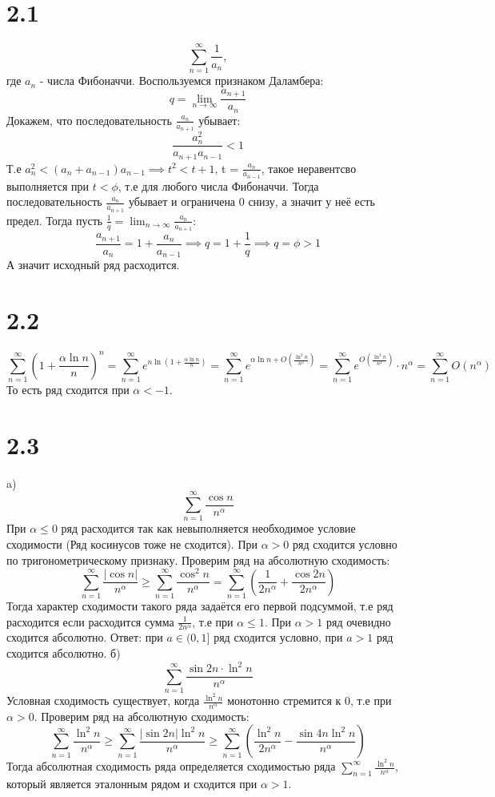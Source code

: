 \documentclass[12pt]{article}
\begin{document}
\section{2.1}
\[
    \sum_{n=1}^{\infty} \frac{1}{a_n},
\]
где $a_n$ - числа Фибоначчи. Воспользуемся признаком Даламбера:
\[
    q = \lim_{n \to \infty} \frac{a_{n+1} }{a_{n}}
\] 
Докажем, что последовательность $\frac{a_n}{a_{n+1} }$ убывает: 
\[
    \frac{a_n^2 }{a_{n+1} a_{n-1}} < 1 
\]
Т.е $a_n^2 < (a_n + a_{n-1} ) a_{n-1} \implies t^2 < t + 1$, t = $\frac{a_n}{a_{n-1} }$, такое неравентсво выполняется при $t < \phi$, т.е 
для любого числа Фибоначчи. Тогда последовательность $\frac{a_n}{a_{n+1} }$ убывает и ограничена 0 снизу, а значит у неё есть предел. Тогда 
пусть $\frac{1}{q} = \lim_{n \to \infty} \frac{a_n}{a_{n+1}}$:
\[
    \frac{a_{n+1} }{a_n} = 1 + \frac{a_n}{a_{n-1} } \implies q = 1 + \frac{1}{q} \implies q = \phi > 1
\]
А значит исходный ряд расходится. 
\section{2.2}
\[
    \sum_{n=1}^{\infty} \left( 1 + \frac{\alpha \ln n}{n} \right)^n = 
    \sum_{n=1}^{\infty} e^{n\ln \left( 1 + \frac{\alpha \ln n}{n} \right) } = 
    \sum_{n=1}^{\infty} e^{\alpha \ln n + O(\frac{\ln^2 n}{n^2})} = 
    \sum_{n=1}^{\infty} e^{O(\frac{\ln^2 n}{n^2})} \cdot n^\alpha = 
    \sum_{n=1}^{\infty} O(n^\alpha)
\]
То есть ряд сходится при $\alpha < -1$. 
\section{2.3}
a)
\[
    \sum_{n=1}^{\infty} \frac{\cos n}{n^\alpha }
\]
При $\alpha \leq 0$ ряд расходится так как невыполняется необходимое условие сходимости (Ряд косинусов тоже не сходится). 
При $\alpha > 0$ ряд сходится условно по тригонометрическому признаку.
Проверим ряд на абсолютную сходимость: 
\[
    \sum_{n=1}^{\infty} \frac{\vert \cos n \vert }{n^\alpha} \geq  \sum_{n=1}^{\infty} \frac{\cos^2 n}{n^\alpha} = 
    \sum_{n=1}^{\infty} \left( \frac{1}{2n^\alpha } + \frac{\cos 2n}{2n^\alpha} \right) 
\]
Тогда характер сходимости такого ряда задаётся его первой подсуммой, т.е ряд расходится если расходится сумма 
$\frac{1}{2n^\alpha }$, т.е при $\alpha \leq 1$. При $\alpha > 1$ ряд очевидно сходится абсолютно.
Ответ: при $a \in (0, 1]$ ряд сходится условно, при $a > 1$ ряд сходится абсолютно.  
б) 
\[
    \sum_{n=1}^{\infty} \frac{\sin 2n \cdot \ln ^2 n}{n^\alpha}
\]
Условная сходимость существует, когда $\frac{\ln^2 n}{n^\alpha }$ монотонно стремится к 0, т.е при $\alpha > 0$.
Проверим ряд на абсолютную сходимость: 
\[
    \sum_{n=1}^{\infty} \frac{\ln^2 n}{n^\alpha } \geq \sum_{n=1}^{\infty} \frac{\vert \sin 2n \vert \ln^2 n}{n^\alpha} \geq \sum_{n=1}^{\infty} \left( \frac{\ln^2 n}{2n^\alpha } - \frac{\sin 4n \ln^2 n}{n^\alpha} \right) 
\]
Тогда абсолютная сходимость ряда определяется сходимостью ряда $\sum_{n=1}^{\infty} \frac{\ln^2 n}{n^\alpha }$, который является эталонным рядом и сходится при $\alpha > 1$.  
\end{document}
